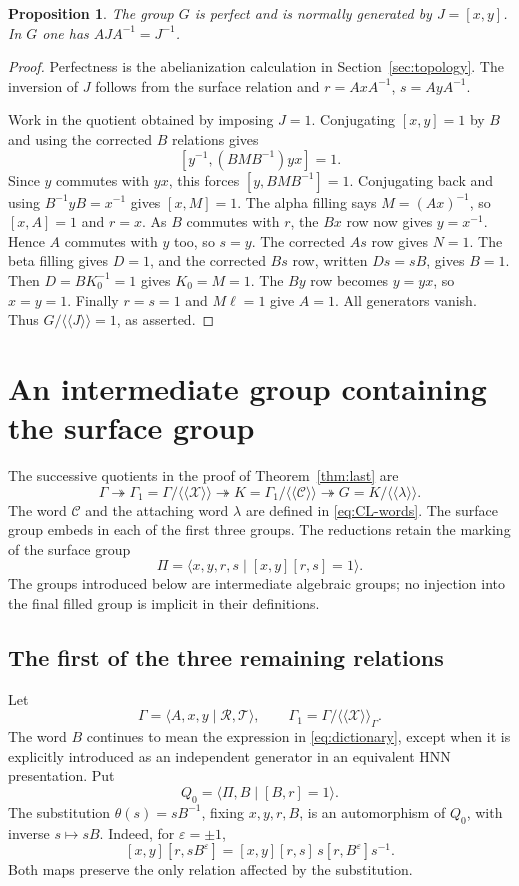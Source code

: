 \documentclass[11pt]{amsart}
\newtheorem{proposition}[theorem]{Proposition}
\theoremstyle{definition}
\theoremstyle{remark}
\newcommand{\nc}[1]{\langle\!\langle #1\rangle\!\rangle}
\begin{document}
\begin{proposition}\label{prop:J}
The group $G$ is perfect and is normally generated by $J=[x,y]$.
In $G$ one has $AJA^{-1}=J^{-1}$.
\end{proposition}
\begin{proof}
Perfectness is the abelianization calculation in
Section~\ref{sec:topology}. The inversion of $J$ follows from the
surface relation and $r=AxA^{-1}$, $s=AyA^{-1}$.

Work in the quotient obtained by imposing $J=1$. Conjugating
$[x,y]=1$ by $B$ and using the corrected $B$ relations gives
\[
                    [y^{-1},(BMB^{-1})yx]=1.
\]
Since $y$ commutes with $yx$, this forces
$[y,BMB^{-1}]=1$. Conjugating back and using $B^{-1}yB=x^{-1}$
gives $[x,M]=1$. The alpha filling says $M=(Ax)^{-1}$, so
$[x,A]=1$ and $r=x$. As $B$ commutes with $r$, the $Bx$ row now
gives $y=x^{-1}$. Hence $A$ commutes with $y$ too, so $s=y$.
The corrected $As$ row gives $N=1$. The beta filling gives $D=1$,
and the corrected $Bs$ row, written $Ds=sB$, gives $B=1$.
Then $D=BK_0^{-1}=1$ gives $K_0=M=1$. The $By$ row becomes
$y=yx$, so $x=y=1$. Finally $r=s=1$ and $M\ell=1$ give $A=1$.
All generators vanish. Thus $G/\nc J=1$, as asserted.
\end{proof}


\section{An intermediate group containing the surface group}
\label{sec:intermediate}

The successive quotients in the proof of Theorem~\ref{thm:last} are
\[
 \Gamma\twoheadrightarrow\Gamma_1=\Gamma/\nc{\mathcal X}
 \twoheadrightarrow K=\Gamma_1/\nc{\mathcal C}
 \twoheadrightarrow G=K/\nc\lambda.
\]
The word $\mathcal C$ and the attaching word $\lambda$ are defined
in \eqref{eq:CL-words}. The surface group embeds in each of the first
three groups. The reductions retain the
marking of the surface group
\[
                    \Pi=\langle x,y,r,s\mid[x,y][r,s]=1\rangle.
\]
The groups introduced below are intermediate algebraic groups; no
injection into the final filled group is implicit in their definitions.

\subsection{The first of the three remaining relations}
Let
\[
 \Gamma=\langle A,x,y\mid\mathcal R,\mathcal T\rangle,
 \qquad \Gamma_1=\Gamma/\nc{\mathcal X}_\Gamma.
\]
The word $B$ continues to mean the expression in
\eqref{eq:dictionary}, except when it is explicitly introduced as
an independent generator in an equivalent HNN presentation.
Put
\[
                       Q_0=\langle\Pi,B\mid[B,r]=1\rangle.
\]
The substitution $\theta(s)=sB^{-1}$, fixing $x,y,r,B$, is an
automorphism of $Q_0$, with inverse $s\mapsto sB$. Indeed, for
$\varepsilon=\pm1$,
\begin{equation}\label{eq:theta-surface}
 [x,y][r,sB^\varepsilon]
       =[x,y][r,s]\,s[r,B^\varepsilon]s^{-1}.
\end{equation}
Both maps preserve the only relation affected by the substitution.
\end{document}
